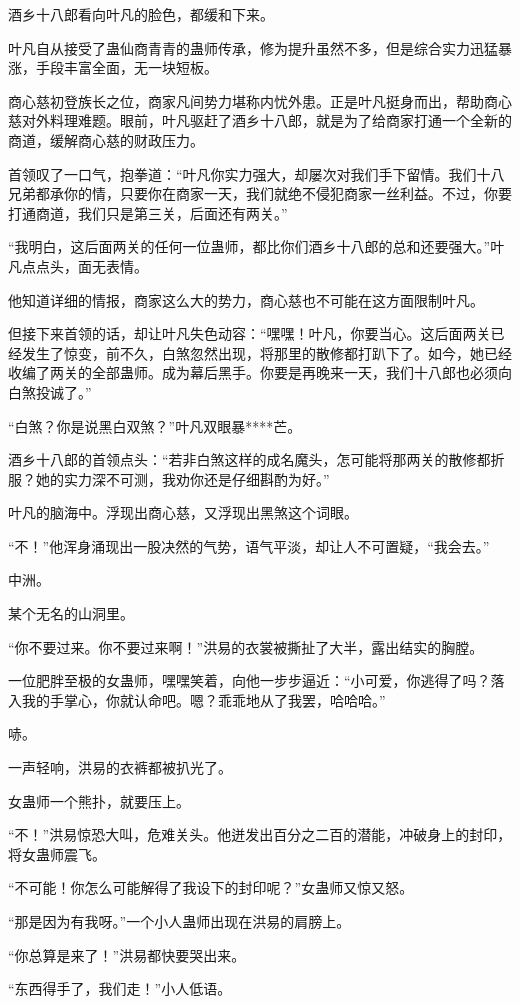 \begin{this_body}
酒乡十八郎看向叶凡的脸色，都缓和下来。

叶凡自从接受了蛊仙商青青的蛊师传承，修为提升虽然不多，但是综合实力迅猛暴涨，手段丰富全面，无一块短板。

商心慈初登族长之位，商家凡间势力堪称内忧外患。正是叶凡挺身而出，帮助商心慈对外料理难题。眼前，叶凡驱赶了酒乡十八郎，就是为了给商家打通一个全新的商道，缓解商心慈的财政压力。

首领叹了一口气，抱拳道：“叶凡你实力强大，却屡次对我们手下留情。我们十八兄弟都承你的情，只要你在商家一天，我们就绝不侵犯商家一丝利益。不过，你要打通商道，我们只是第三关，后面还有两关。”

“我明白，这后面两关的任何一位蛊师，都比你们酒乡十八郎的总和还要强大。”叶凡点点头，面无表情。

他知道详细的情报，商家这么大的势力，商心慈也不可能在这方面限制叶凡。

但接下来首领的话，却让叶凡失色动容：“嘿嘿！叶凡，你要当心。这后面两关已经发生了惊变，前不久，白煞忽然出现，将那里的散修都打趴下了。如今，她已经收编了两关的全部蛊师。成为幕后黑手。你要是再晚来一天，我们十八郎也必须向白煞投诚了。”

“白煞？你是说黑白双煞？”叶凡双眼暴****芒。

酒乡十八郎的首领点头：“若非白煞这样的成名魔头，怎可能将那两关的散修都折服？她的实力深不可测，我劝你还是仔细斟酌为好。”

叶凡的脑海中。浮现出商心慈，又浮现出黑煞这个词眼。

“不！”他浑身涌现出一股决然的气势，语气平淡，却让人不可置疑，“我会去。”

中洲。

某个无名的山洞里。

“你不要过来。你不要过来啊！”洪易的衣裳被撕扯了大半，露出结实的胸膛。

一位肥胖至极的女蛊师，嘿嘿笑着，向他一步步逼近：“小可爱，你逃得了吗？落入我的手掌心，你就认命吧。嗯？乖乖地从了我罢，哈哈哈。”

哧。

一声轻响，洪易的衣裤都被扒光了。

女蛊师一个熊扑，就要压上。

“不！”洪易惊恐大叫，危难关头。他迸发出百分之二百的潜能，冲破身上的封印，将女蛊师震飞。

“不可能！你怎么可能解得了我设下的封印呢？”女蛊师又惊又怒。

“那是因为有我呀。”一个小人蛊师出现在洪易的肩膀上。

“你总算是来了！”洪易都快要哭出来。

“东西得手了，我们走！”小人低语。


\end{this_body}
